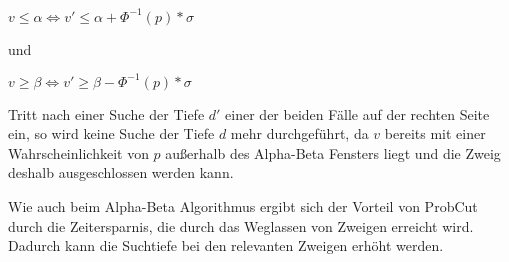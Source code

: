 \hspace*{1.3cm}
\(v\leq\alpha \iff v'\leq\alpha+\Phi^{-1}(p)*\sigma\)

und

\hspace*{1.3cm}
\(v\geq\beta \iff v'\geq\beta-\Phi^{-1}(p)*\sigma\)

Tritt nach einer Suche der Tiefe \(d'\) einer der beiden Fälle auf der rechten Seite ein, so wird keine Suche der Tiefe \(d\) mehr durchgeführt, da \(v\) bereits mit einer Wahrscheinlichkeit von \(p\) außerhalb des Alpha-Beta Fensters liegt
und die Zweig deshalb ausgeschlossen werden kann.

Wie auch beim Alpha-Beta Algorithmus ergibt sich der Vorteil von ProbCut durch die Zeitersparnis, die durch das Weglassen von Zweigen erreicht wird. Dadurch kann die Suchtiefe bei den relevanten Zweigen erhöht werden.
\cite[S.~1]{probcut}

